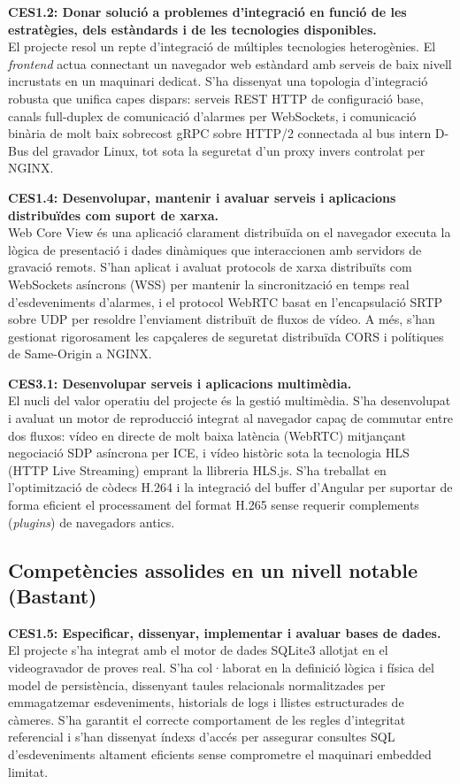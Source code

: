 \noindent \textbf{CES1.2: Donar solució a problemes d'integració en funció de les estratègies, dels estàndards i de les tecnologies disponibles.}\\
El projecte resol un repte d'integració de múltiples tecnologies heterogènies. El \textit{frontend} actua connectant un navegador web estàndard amb serveis de baix nivell incrustats en un maquinari dedicat. S'ha dissenyat una topologia d'integració robusta que unifica capes dispars: serveis REST HTTP de configuració base, canals full-duplex de comunicació d'alarmes per WebSockets, i comunicació binària de molt baix sobrecost gRPC sobre HTTP/2 connectada al bus intern D-Bus del gravador Linux, tot sota la seguretat d'un proxy invers controlat per NGINX.

\noindent \textbf{CES1.4: Desenvolupar, mantenir i avaluar serveis i aplicacions distribuïdes com suport de xarxa.}\\
Web Core View és una aplicació clarament distribuïda on el navegador executa la lògica de presentació i dades dinàmiques que interaccionen amb servidors de gravació remots. S'han aplicat i avaluat protocols de xarxa distribuïts com WebSockets asíncrons (WSS) per mantenir la sincronització en temps real d'esdeveniments d'alarmes, i el protocol WebRTC basat en l'encapsulació SRTP sobre UDP per resoldre l'enviament distribuït de fluxos de vídeo. A més, s'han gestionat rigorosament les capçaleres de seguretat distribuïda CORS i polítiques de Same-Origin a NGINX.

\noindent \textbf{CES3.1: Desenvolupar serveis i aplicacions multimèdia.}\\
El nucli del valor operatiu del projecte és la gestió multimèdia. S'ha desenvolupat i avaluat un motor de reproducció integrat al navegador capaç de commutar entre dos fluxos: vídeo en directe de molt baixa latència (WebRTC) mitjançant negociació SDP asíncrona per ICE, i vídeo històric sota la tecnologia HLS (HTTP Live Streaming) emprant la llibreria HLS.js. S'ha treballat en l'optimització de còdecs H.264 i la integració del buffer d'Angular per suportar de forma eficient el processament del format H.265 sense requerir complements (\textit{plugins}) de navegadors antics.

\subsection{Competències assolides en un nivell notable (Bastant)}

\noindent \textbf{CES1.5: Especificar, dissenyar, implementar i avaluar bases de dades.}\\
El projecte s'ha integrat amb el motor de dades SQLite3 allotjat en el videogravador de proves real. S'ha col·laborat en la definició lògica i física del model de persistència, dissenyant taules relacionals normalitzades per emmagatzemar esdeveniments, historials de logs i llistes estructurades de càmeres. S'ha garantit el correcte comportament de les regles d'integritat referencial i s'han dissenyat índexs d'accés per assegurar consultes SQL d'esdeveniments altament eficients sense comprometre el maquinari embedded limitat.

